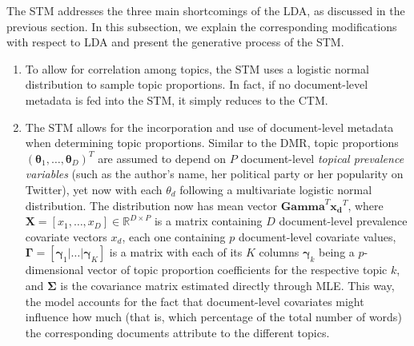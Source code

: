 The STM addresses the three main shortcomings of the LDA, as discussed in the previous section. In this subsection, we explain the corresponding modifications with respect to LDA and present the generative process of the STM.

\begin{enumerate}[label=(\roman*)]
\vspace{-0.25cm}
\item To allow for correlation among topics, the STM uses a logistic normal distribution to sample topic proportions. In fact, if no document-level metadata is fed into the STM, it simply reduces to the CTM.
\vspace{-0.25cm}
\item The STM allows for the incorporation and use of document-level metadata when determining topic proportions. Similar to the DMR, topic proportions $(\boldsymbol{\theta}_1,\dots,\boldsymbol{\theta}_D)^T$ are assumed to depend on $P$ document-level \textit{topical prevalence variables} (such as the author's name, her political party or her popularity on Twitter), yet now with each $\theta_d$ following a multivariate logistic normal distribution. The distribution now has mean vector $\boldsymbol{Gamma}^T\boldsymbol{x_d}^T$, where $\boldsymbol{X}=[x_1,\dots,x_D] \in \mathbb{R}^{D \times P}$ is a matrix containing $D$ document-level prevalence covariate vectors $x_d$, each one containing $p$ document-level covariate values, $\boldsymbol{\Gamma} = [\boldsymbol{\gamma}_1|\dots|\boldsymbol{\gamma}_K]$ is a matrix with each of its $K$ columns $\boldsymbol{\gamma}_k$ being a $p$-dimensional vector of topic proportion coefficients for the respective topic $k$, and $\boldsymbol{\Sigma}$ is the covariance matrix estimated directly through MLE. This way, the model accounts for the fact that document-level covariates might influence how much (that is, which percentage of the total number of words) the corresponding documents attribute to the different topics.
\vspace{-0.25cm}

\end{enumerate}
